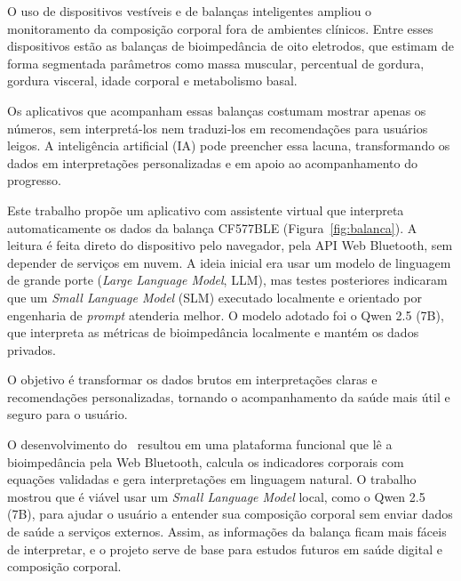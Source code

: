 O uso de dispositivos vestíveis e de balanças inteligentes ampliou o monitoramento da
composição corporal fora de ambientes clínicos. Entre esses dispositivos estão as
balanças de bioimpedância de oito eletrodos, que estimam de forma segmentada
parâmetros como massa muscular, percentual de gordura, gordura visceral, idade
corporal e metabolismo basal.

Os aplicativos que acompanham essas balanças costumam mostrar apenas os números, sem
interpretá-los nem traduzi-los em recomendações para usuários leigos. A inteligência
artificial (IA) pode preencher essa lacuna, transformando os dados em interpretações
personalizadas e em apoio ao acompanhamento do progresso.

Este trabalho propõe um aplicativo com assistente virtual que interpreta
automaticamente os dados da balança CF577BLE (Figura~\ref{fig:balanca}). A leitura é
feita direto do dispositivo pelo navegador, pela API Web Bluetooth, sem depender de
serviços em nuvem. A ideia inicial era usar um modelo de linguagem de grande porte
(\emph{Large Language Model}, LLM), mas testes posteriores indicaram que um
\emph{Small Language Model} (SLM) executado localmente e orientado por engenharia de
\emph{prompt} atenderia melhor. O modelo adotado foi o Qwen 2.5 (7B), que interpreta as métricas de
bioimpedância localmente e mantém os dados privados.

O objetivo é transformar os dados brutos em interpretações claras e recomendações
personalizadas, tornando o acompanhamento da saúde mais útil e seguro para o usuário.


O desenvolvimento do \sintonia\ resultou em uma plataforma funcional que lê a
bioimpedância pela Web Bluetooth, calcula os indicadores corporais com equações
validadas e gera interpretações em linguagem natural. O trabalho mostrou que é viável
usar um \emph{Small Language Model} local, como o Qwen 2.5 (7B), para ajudar o usuário
a entender sua composição corporal sem enviar dados de saúde a serviços externos.
Assim, as informações da balança ficam mais fáceis de interpretar, e o projeto serve
de base para estudos futuros em saúde digital e composição corporal.
